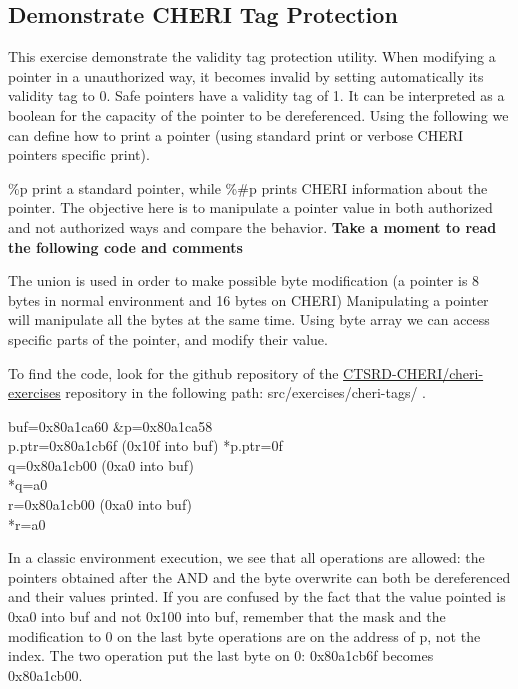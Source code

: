 \documentclass[a4paper, 11pt]{article}
\begin{document}
\subsection{Demonstrate CHERI Tag Protection}
	This exercise demonstrate the validity tag protection utility.
	When modifying a pointer in a unauthorized way, it becomes invalid by setting automatically its validity tag to 0. Safe pointers have a validity tag of 1.
	It can be interpreted as a boolean for the capacity of the pointer to be dereferenced.
	Using the following we can define how to print a pointer (using standard print or verbose CHERI pointers specific print).
	
	\%p print a standard pointer, while \%\#p prints CHERI information about the pointer.
	The objective here is to manipulate a pointer value in both authorized and not authorized ways and compare the behavior.
	\textbf{Take a moment to read the following code and comments}
	
	The union is used in order to make possible byte modification (a pointer is 8 bytes in normal environment and 16 bytes on CHERI)
	Manipulating a pointer will manipulate all the bytes at the same time. Using byte array we can access specific parts of the pointer, and modify their value.
	

To find the code, look for the github repository of the \href{https://github.com/CTSRD-CHERI/cheri-exercises}{CTSRD-CHERI/cheri-exercises} repository in the following path: src/exercises/cheri-tags/ . 


\begin{tcolorbox}[colback=gray!5!white, colframe=gray!75!black, title=Output on a classic \Gls{risc-v} environment (no CHERI Protection)]
buf=0x80a1ca60 \&p=0x80a1ca58\\
p.ptr=0x80a1cb6f (0x10f into buf) *p.ptr=0f\\
q=0x80a1cb00 (0xa0 into buf)\\
*q=a0\\
r=0x80a1cb00 (0xa0 into buf)\\
*r=a0
\end{tcolorbox}
In a classic environment execution, we see that all operations are allowed: the pointers obtained after the AND and the byte overwrite can both be dereferenced and their values printed.
If you are confused by the fact that the value pointed is 0xa0 into buf and not 0x100 into buf, remember that the mask and the modification to 0 on the last byte operations are on the address of p, not the index.
The two operation put the last byte on 0: 0x80a1cb6f  becomes 0x80a1cb00.
\end{document}
